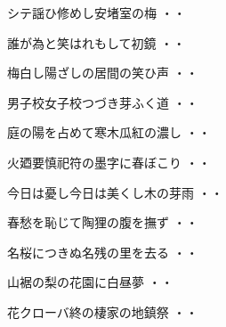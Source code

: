 \vspace{0.6cm}
\begin{shiika}シテ謡ひ修めし安堵室の梅
\hfill{・・}\end{shiika}
\vspace{0.6cm}
\begin{shiika}誰が為と笑はれもして初鏡
\hfill{・・}\end{shiika}
\vspace{0.6cm}
\begin{shiika}梅白し陽ざしの居間の笑ひ声
\hfill{・・}\end{shiika}
\vspace{0.6cm}
\begin{shiika}男子校女子校つづき芽ふく道
\hfill{・・}\end{shiika}
\vspace{0.6cm}
\begin{shiika}庭の陽を占めて寒木瓜紅の濃し
\hfill{・・}\end{shiika}
\vspace{0.6cm}
\begin{shiika}火廼要慎祀符の墨字に春ぼこり
\hfill{・・}\end{shiika}
\vspace{0.6cm}
\begin{shiika}今日は憂し今日は美くし木の芽雨
\hfill{・・}\end{shiika}
\vspace{0.6cm}
\begin{shiika}春愁を恥じて陶狸の腹を撫ず
\hfill{・・}\end{shiika}
\vspace{0.6cm}
\begin{shiika}名桜につきぬ名残の里を去る
\hfill{・・}\end{shiika}
\vspace{0.6cm}
\begin{shiika}山裾の梨の花園に白昼夢
\hfill{・・}\end{shiika}
\vspace{0.6cm}
\begin{shiika}花クローバ終の棲家の地鎮祭
\hfill{・・}\end{shiika}
